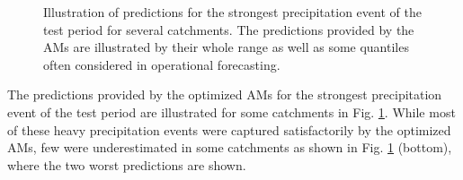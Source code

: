 \documentclass[draft]{agujournal2019}
\begin{document}
\begin{figure}[hbtp]
	\noindent{}
	\caption{Illustration of predictions for the strongest precipitation event of the test period for several catchments. The predictions provided by the AMs are illustrated by their whole range as well as some quantiles often considered in operational forecasting.}
	\label{fig_events}
\end{figure}

The predictions provided by the optimized AMs for the strongest precipitation event of the test period are illustrated for some catchments in Fig. \ref{fig_events}. While most of these heavy precipitation events were captured satisfactorily by the optimized AMs, few were underestimated in some catchments as shown in Fig. \ref{fig_events} (bottom), where the two worst predictions are shown.
\end{document}
